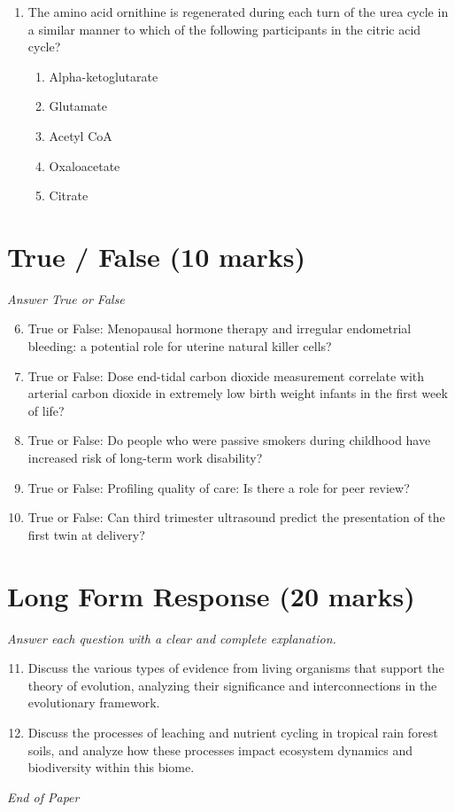 \documentclass[12pt]{article}
\begin{document}
\begin{enumerate}[label=\arabic*.]
\begin{enumerate}[label=(\alph*)]
    \item Ribosome
    \item Mitochondrion
    \item Chloroplast
    \item Lysosome
    \item Endoplasmic reticulum
\end{enumerate}
\item The amino acid ornithine is regenerated during each turn of the urea cycle in a similar manner to which of the following participants in the citric acid cycle?
\begin{enumerate}[label=(\alph*)]
    \item Alpha-ketoglutarate
    \item Glutamate
    \item Acetyl CoA
    \item Oxaloacetate
    \item Citrate
\end{enumerate}
\end{enumerate}

\section*{True / False (10 marks)}
\textit{Answer True or False}
\begin{enumerate}[label=\arabic*.]
\setcounter{enumi}{5}
\item True or False: Menopausal hormone therapy and irregular endometrial bleeding: a potential role for uterine natural killer cells?
\item True or False: Dose end-tidal carbon dioxide measurement correlate with arterial carbon dioxide in extremely low birth weight infants in the first week of life?
\item True or False: Do people who were passive smokers during childhood have increased risk of long-term work disability?
\item True or False: Profiling quality of care: Is there a role for peer review?
\item True or False: Can third trimester ultrasound predict the presentation of the first twin at delivery?
\end{enumerate}

\section*{Long Form Response (20 marks)}
\textit{Answer each question with a clear and complete explanation.}
\begin{enumerate}[label=\arabic*.]
\setcounter{enumi}{10}
\item Discuss the various types of evidence from living organisms that support the theory of evolution, analyzing their significance and interconnections in the evolutionary framework.
\item Discuss the processes of leaching and nutrient cycling in tropical rain forest soils, and analyze how these processes impact ecosystem dynamics and biodiversity within this biome.
\end{enumerate}

\vfill
\noindent\textit{End of Paper}
\end{document}
